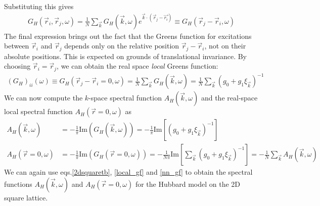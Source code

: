 \documentclass[12pt]{article}
\numberwithin{equation}{section}
\begin{document}
Substituting this gives
\begin{equation}\begin{aligned}
	G_H(\vec r_i, \vec  r_j, \omega) = \frac{1}{N}\sum_{\vec k} G_H(\vec k, \omega)  e^{\vec{k}\cdot\left(\vec r_j - \vec{r_i}\right)} \equiv G_H(\vec r_j - \vec  r_i, \omega)
\end{aligned}\end{equation}
The final expression brings out the fact that the Greens function for excitations between \(\vec r_i\) and \(\vec r_j\) depends only on the relative position \(\vec r_j - \vec r_i\), not on their absolute positions. This is expected on grounds of translational invariance. By choosing \(\vec r_i = \vec r_j\), we can obtain the real space \textit{local} Greens function:
\begin{equation}\begin{aligned}
	\left(G_H\right)_{ii}(\omega) \equiv G_H(\vec r_j - \vec  r_i = 0, \omega) = \frac{1}{N}\sum_{\vec k} G_H(\vec k, \omega) = \frac{1}{N}\sum_{\vec k}\left(g_0 + g_1 \xi_{\vec k}\right)^{-1}
\end{aligned}\end{equation}
We can now compute the $k$-space spectral function $A_{H}(\vec{k},\omega)$ and the real-space local spectral function $A_{H}(\vec{r}=0,\omega)$ as
\begin{equation}\begin{aligned}
A_{H}(\vec{k},\omega) &= -\frac{1}{\pi} \textrm{Im}(G_{H}(\vec{k},\omega)) = -\frac{1}{\pi} \textrm{Im}\left[ (g_{0} + g_{1}\xi_{\vec{k}})^{-1}\right]\\
A_{H}(\vec{r}=0,\omega) &= -\frac{1}{\pi} \textrm{Im}(G_{H}(\vec{r}=0,\omega)) = -\frac{1}{N\pi} \textrm{Im}\left[\sum_{\vec{k}} (g_{0} + g_{1}\xi_{\vec{k}})^{-1}\right] = -\frac{1}{N}\sum_{\vec{k}}A_{H}(\vec{k},\omega)
\end{aligned}\end{equation}
We can again use eqs.\eqref{2dsquaretb}, \eqref{local_gf} and \eqref{nn_gf} to obtain the spectral functions  $A_{H} (\vec{k},\omega)$ and $A_{H} (\vec{r}=0,\omega)$ for the Hubbard model on the 2D square lattice.
\end{document}
